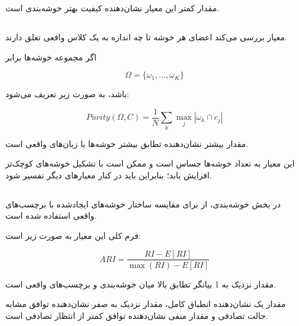 \documentclass[12pt,a4paper,oneside]{report}
\begin{document}
مقدار کمتر این معیار نشان‌دهنده کیفیت بهتر خوشه‌بندی است.
\subsection{}

معیار
بررسی می‌کند اعضای هر خوشه تا چه اندازه به یک کلاس واقعی تعلق دارند.

اگر مجموعه خوشه‌ها برابر

\begin{equation}
\Omega
=
\{\omega_1,\ldots,\omega_K\}
\end{equation}

باشد،
به صورت زیر تعریف می‌شود:

\begin{equation}
Purity(\Omega,C)
=
\frac{1}{N}
\sum_k
\max_j
|\omega_k\cap c_j|
\end{equation}

مقدار بیشتر
نشان‌دهنده تطابق بیشتر خوشه‌ها با زبان‌های واقعی است.

این معیار به تعداد خوشه‌ها حساس است و ممکن است با تشکیل خوشه‌های کوچک‌تر افزایش یابد؛ بنابراین باید در کنار معیارهای دیگر تفسیر شود.


\subsection{}

در بخش خوشه‌بندی، از
برای مقایسه ساختار خوشه‌های ایجادشده با برچسب‌های واقعی استفاده شده است.

فرم کلی این معیار به صورت زیر است:

\begin{equation}
ARI
=
\frac{
RI-E[RI]
}{
\max(RI)-E[RI]
}
\end{equation}

مقدار نزدیک به 1 بیانگر تطابق بالا میان خوشه‌بندی و برچسب‌های واقعی است.

مقدار یک نشان‌دهنده انطباق کامل، مقدار نزدیک به صفر نشان‌دهنده توافق مشابه حالت تصادفی و مقدار منفی نشان‌دهنده توافق کمتر از انتظار تصادفی است.


\subsection{}
\end{document}
